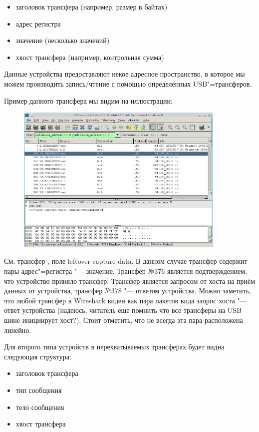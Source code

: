 \documentclass[10pt, a5paper]{article}
\begin{document}
\begin{itemize}
  \item заголовок трансфера (например, размер в байтах)
  \item адрес регистра
  \item значение (несколько значений)
  \item хвост трансфера (например, контрольная сумма)
\end{itemize}

Данные устройства предоставляют некое адресное пространство, в которое мы можем производить запись/чтение с помощью определённых USB"=трансферов.

Пример данного трансфера мы видим на иллюстрации:

\begin{figure}[h!]
  \centering
  \includegraphics[width=10cm]{12_traffic-sample.png}
\end{figure}

См. трансфер , поле leftover capture data. В данном случае трансфер содержит пары адрес"=регистра "--- значение. Трансфер №376 является подтверждением, что устройство приняло трансфер. Трансфер  является запросом от хоста на приём данных от устройства, трансфер №378 "--- ответом устройства. Можно заметить, что любой трансфер в Wireshark виден как пара пакетов вида запрос хоста "--- ответ устройства (надеюсь, читатель еще помнить что все трансферы на USB шине инициирует хост?). Стоит отметить, что не всегда эта пара расположена линейно.

Для второго типа устройств в перехватываемых трансферах будет видна следующая структура:

\begin{itemize}
  \item заголовок трансфера
  \item тип сообщения
  \item тело сообщения
  \item хвост трансфера
\end{itemize}
\end{document}
